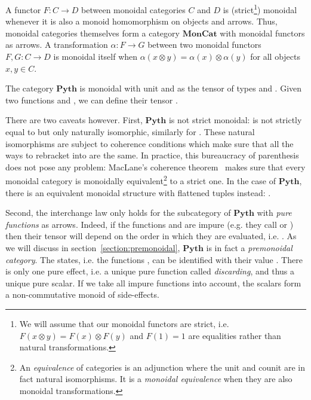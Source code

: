 A functor $F : C \to D$ between monoidal categories $C$ and $D$ is (strict\footnote
{We will assume that our monoidal functors are strict, i.e. $F(x \otimes y) = F(x) \otimes F(y)$ and $F(1) = 1$ are equalities rather than natural transformations.}) monoidal whenever it is also a monoid homomorphism on objects and arrows.
Thus, monoidal categories themselves form a category $\mathbf{MonCat}$ with monoidal functors as arrows.
A transformation $\alpha : F \to G$ between two monoidal functors $F, G : C \to D$ is monoidal itself when $\alpha(x \otimes y) = \alpha(x) \otimes \alpha(y)$ for all objects $x, y \in C$.

\begin{example}
The category $\mathbf{Pyth}$ is monoidal with unit \py{()} and  as the tensor of types  and .
Given two functions  and , we can define their tensor .

There are two caveats however.
First, $\mathbf{Pyth}$ is not strict monoidal:  is not strictly equal to  but only naturally isomorphic, similarly for .
These natural isomorphisms are subject to coherence conditions which make sure that all the ways to rebracket  into  are the same.
In practice, this bureaucracy of parenthesis does not pose any problem: MacLane's coherence theorem~\cite[VII]{MacLane71} makes sure that every monoidal category is monoidally equivalent\footnote
{An \emph{equivalence} of categories is an adjunction where the unit and counit are in fact natural isomorphisms.
It is a \emph{monoidal equivalence} when they are also monoidal transformations.} to a strict one.
In the case of $\mathbf{Pyth}$, there is an equivalent monoidal structure with flattened tuples instead: .

Second, the interchange law only holds for the subcategory of $\mathbf{Pyth}$ with \emph{pure functions} as arrows.
Indeed, if the functions  and  are impure (e.g. they call  or ) then their tensor  will depend on the order in which they are evaluated, i.e. .
As we will discuss in section~\ref{section:premonoidal}, $\mathbf{Pyth}$ is in fact a \emph{premonoidal category}.
The states, i.e. the functions , can be identified with their value .
There is only one pure effect, i.e. a unique pure function  called \emph{discarding}, and thus a unique pure scalar.
If we take all impure functions into account, the scalars form a non-commutative monoid of side-effects.
\end{example}

